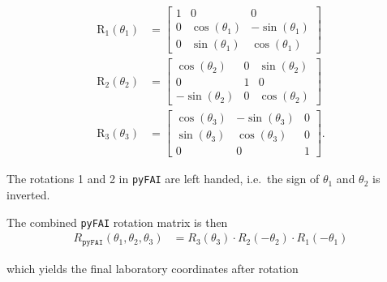 \documentclass[12pt]{article}
\begin{document}
\begin{align}
  \mathrm{R}_1(\theta_1)
  & =
  \begin{bmatrix}
    1 & 0 & 0 \\
    0 & \cos(\theta_1) & -\sin(\theta_1) \\
    0 & \sin(\theta_1) & \cos(\theta_1)
  \end{bmatrix}
  \label{eq-rot1}
  \\
  \mathrm{R}_2(\theta_2)
  & =
  \begin{bmatrix}
    \cos(\theta_2) & 0 & \sin(\theta_2) \\
    0 & 1 & 0 \\
    -\sin(\theta_2) & 0 & \cos(\theta_2)
  \end{bmatrix}
  \label{eq-rot2}
  \\
  \mathrm{R}_3(\theta_3)
  & =
  \begin{bmatrix}
    \cos(\theta_3) & -\sin(\theta_3) & 0\\
    \sin(\theta_3) & \cos(\theta_3) & 0\\
    0 & 0 & 1
  \end{bmatrix}.
  \label{eq-rot3}
\end{align}

The rotations 1 and 2 in \texttt{pyFAI} are left handed, i.e.~the sign
of $\theta_1$ and $\theta_2$ is inverted.

The combined \texttt{pyFAI} rotation matrix is then
\begin{align}
  R_{\mathtt{pyFAI}}(\theta_1, \theta_2, \theta_3)
  & =
  R_3(\theta_3) \cdot R_2(-\theta_2) \cdot R_1(-\theta_1)
\end{align}

which yields the final  laboratory coordinates after rotation
\end{document}

